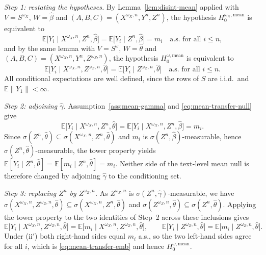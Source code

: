 \documentclass[twoside,11pt]{article}
\begin{document}
\begin{proofE}
\emph{Step 1: restating the hypotheses.} By Lemma~\ref{lem:disint-mean} applied with
$V=S^{\omega_X}$, $W=\hat\beta$ and $(A,B,C)=(X^{\omega_X,n},Y^n,Z^n)$, the hypothesis
$H_0^{\omega_X,\mathrm{mean}}$ is equivalent to
\begin{equation}\label{eq:mean-transfer-null}
  \mathbb E\big[Y_i\mid X^{\omega_X,n},Z^n,\hat\beta\big]
  =\mathbb E\big[Y_i\mid Z^n,\hat\beta\big]=m_i
  \quad\text{a.s. for all } i\le n ,
\end{equation}
and by the same lemma with $V=S^{\omega}$, $W=\hat\theta$ and
$(A,B,C)=(X^{\omega_X,n},Y^n,Z^{\omega_Z,n})$, the hypothesis $H_0^{\omega,\mathrm{mean}}$
is equivalent to
\begin{equation}\label{eq:mean-transfer-emb}
  \mathbb E\big[Y_i\mid X^{\omega_X,n},Z^{\omega_Z,n},\hat\theta\big]
  =\mathbb E\big[Y_i\mid Z^{\omega_Z,n},\hat\theta\big]
  \quad\text{a.s. for all } i\le n .
\end{equation}
All conditional expectations are well defined, since the rows of $S$ are i.i.d.\ and
$\mathbb E\|Y_1\|<\infty$.

\emph{Step 2: adjoining $\hat\gamma$.} Assumption~\ref{ass:mean-gamma} and
\eqref{eq:mean-transfer-null} give
\[
  \mathbb E\big[Y_i\mid X^{\omega_X,n},Z^n,\hat\theta\big]
  =\mathbb E\big[Y_i\mid X^{\omega_X,n},Z^n,\hat\beta\big]=m_i .
\]
Since $\sigma(Z^n,\hat\theta)\subseteq\sigma(X^{\omega_X,n},Z^n,\hat\theta)$ and $m_i$ is
$\sigma(Z^n,\hat\beta)$-measurable, hence $\sigma(Z^n,\hat\theta)$-measurable, the tower
property yields $\mathbb E[Y_i\mid Z^n,\hat\theta]=\mathbb E[m_i\mid Z^n,\hat\theta]=m_i$.
Neither side of the text-level mean null is therefore changed by adjoining $\hat\gamma$
to the conditioning set.

\emph{Step 3: replacing $Z^n$ by $Z^{\omega_Z,n}$.} As $Z^{\omega_Z,n}$ is
$\sigma(Z^n,\hat\gamma)$-measurable, we have
$\sigma(X^{\omega_X,n},Z^{\omega_Z,n},\hat\theta)\subseteq
\sigma(X^{\omega_X,n},Z^n,\hat\theta)$ and
$\sigma(Z^{\omega_Z,n},\hat\theta)\subseteq\sigma(Z^n,\hat\theta)$. Applying the tower
property to the two identities of Step~2 across these inclusions gives
\begin{equation}\label{eq:mean-transfer-step3}
  \mathbb E\big[Y_i\mid X^{\omega_X,n},Z^{\omega_Z,n},\hat\theta\big]
  =\mathbb E\big[m_i\mid X^{\omega_X,n},Z^{\omega_Z,n},\hat\theta\big],
  \qquad
  \mathbb E\big[Y_i\mid Z^{\omega_Z,n},\hat\theta\big]
  =\mathbb E\big[m_i\mid Z^{\omega_Z,n},\hat\theta\big].
\end{equation}
Under (ii$'$) both right-hand sides equal $m_i$ a.s., so the two left-hand sides agree for
all $i$, which is \eqref{eq:mean-transfer-emb} and hence
$H_0^{\omega,\mathrm{mean}}$.
\end{proofE}
\end{document}
